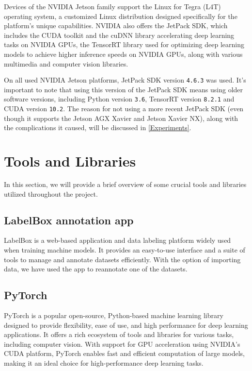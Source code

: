 Devices of the NVIDIA Jetson family support the Linux for Tegra (L4T) operating
system, a customized Linux distribution designed specifically for the platform's
unique capabilities. NVIDIA also offers the JetPack SDK, which includes the
CUDA toolkit and the cuDNN library accelerating deep learning tasks on NVIDIA
GPUs, the TensorRT library used for optimizing deep learning models to achieve
higher inference speeds on NVIDIA GPUs, along with various multimedia and
computer vision libraries.

On all used NVIDIA Jetson platforms, JetPack SDK version \texttt{4.6.3} was
used. It's important to note that using this version of the JetPack SDK means
using older software versions, including Python version \texttt{3.6}, TensorRT
version \texttt{8.2.1} and CUDA version \texttt{10.2}. The reason for not using
a more recent JetPack SDK (even though it supports the Jetson AGX Xavier and
Jetson Xavier NX), along with the complications it caused, will be discussed in
\autoref{Experiments}.


\section{Tools and Libraries}

In this section, we will provide a brief overview of some crucial tools and
libraries utilized throughout the project.


\subsection{LabelBox annotation app}

LabelBox \cite{LabelBox} is a web-based application and data labeling platform
widely used when training machine models. It provides an easy-to-use interface
and a suite of tools to manage and annotate datasets efficiently. With the
option of importing data, we have used the app to reannotate one of the
datasets.


\subsection{PyTorch}

PyTorch \cite{PyTorch} is a popular open-source, Python-based machine learning
library designed to provide flexibility, ease of use, and high performance for
deep learning applications. It offers a rich ecosystem of tools and libraries for
various tasks, including computer vision. With support for GPU acceleration
using NVIDIA's CUDA platform, PyTorch enables fast and efficient computation of
large models, making it an ideal choice for high-performance deep learning
tasks.

